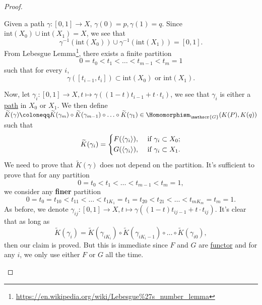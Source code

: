 \begin{proof}
\begin{itemize}
		      Given a path \(\gamma \colon [0, 1]\to X\), \(\gamma (0) = p, \gamma (1) = q\). Since \(\mathrm{int}(X_0) \cup \mathrm{int}(X_1) = X\), we see that
		      \[
			      \gamma ^{-1} (\mathrm{int}(X_0)) \cup \gamma ^{-1} (\mathrm{int}(X_1)) = [0, 1].
		      \]
		      From Lebesgue Lemma\footnote{\url{https://en.wikipedia.org/wiki/Lebesgue\%27s_number_lemma}}, there exists a finite partition
		      \[
			      0 = t_0 < t_1 < \ldots <t_{m-1} < t_{m} = 1
		      \]
		      such that for every \(i\),
		      \[
			      \gamma ([t_{i-1}, t_{i} ])\subset \mathrm{int}(X_0) \text{ or } \mathrm{int}(X_1) .
		      \]
		      \begin{figure}[H]
			      \centering
			      \label{fig:pf:thm:Seifert-Van-Kampen-Theorem-on-groupoid}
		      \end{figure}
		      Now, let \(\gamma _{i} \colon [0, 1]\to X, t\mapsto \gamma ((1-t)t_{i-1}+t\cdot t_{i} )\), we see that \(\gamma _{i} \) is either a \hyperref[def:path]{path} in \(X_0\) or \(X_1\).
		      We then define \(\widetilde{K} (\gamma )\coloneqq \widetilde{K} (\gamma _{m} )\circ \widetilde{K} (\gamma _{m-1}) \circ \ldots \circ \widetilde{K} (\gamma _1)\in \Homomorphism _{\mathscr{G} }(K(P), K(q)) \)
		      such that
		      \[
			      \widetilde{K} (\gamma _{i} ) = \begin{dcases}
				      F(\left< \gamma _{i} \right> ), & \text{ if } \gamma _{i} \subset X_0 ; \\
				      G(\left< \gamma _{i} \right> ), & \text{ if } \gamma _{i} \subset X_1 .
			      \end{dcases}
		      \]
		      We need to prove that \(\widetilde{K} (\gamma )\) does not depend on the partition. It's sufficient to prove that for any partition
		      \[
			      0 = t_0 < t_1 < \ldots <t_{m-1} < t_{m} = 1,
		      \]
		      we consider any \textbf{finer} partition
		      \[
			      0 = t_0= t_{10}< t_{11} <\ldots < t_{1K_1}= t_1 = t_{20} <t_{21}<\ldots < t_{mK_{m} } = t_{m} = 1.
		      \]
		      As before, we denote \(\gamma _{ij}\colon [0, 1]\to X, t\mapsto \gamma ((1-t)t_{i j-1} + t\cdot t_{ij} )\). It's clear that as long as
		      \[
			      \widetilde{K} (\gamma _{i} ) = \widetilde{K} (\gamma _{i K_{i} })\circ \widetilde{K} (\gamma _{i K_{i}-1 })\circ \ldots \circ \widetilde{K} (\gamma _{i 0}),
		      \]
		      then our claim is proved. But this is immediate since \(F\) and \(G\) are \hyperref[def:functor]{functor} and for any \(i\), we only use either \(F\) or \(G\) all the time.


\end{itemize}
\end{proof}
